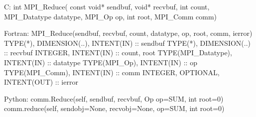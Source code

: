 C:
int MPI_Reduce(
    const void* sendbuf, void* recvbuf, int count, MPI_Datatype datatype,
    MPI_Op op, int root, MPI_Comm comm)

Fortran:
MPI_Reduce(sendbuf, recvbuf, count, datatype, op, root, comm, ierror)
TYPE(*), DIMENSION(..), INTENT(IN) :: sendbuf
TYPE(*), DIMENSION(..) :: recvbuf
INTEGER, INTENT(IN) :: count, root
TYPE(MPI_Datatype), INTENT(IN) :: datatype
TYPE(MPI_Op), INTENT(IN) :: op
TYPE(MPI_Comm), INTENT(IN) :: comm
INTEGER, OPTIONAL, INTENT(OUT) :: ierror

Python:
comm.Reduce(self, sendbuf, recvbuf, Op op=SUM, int root=0)
comm.reduce(self, sendobj=None, recvobj=None, op=SUM, int root=0)
